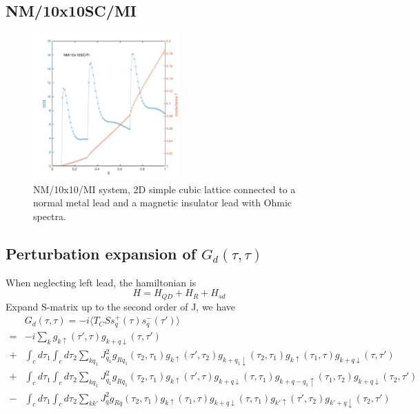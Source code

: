 \documentclass[aps,prb,superscriptaddress]{revtex4-2}
\begin{document}
\subsection{NM/10x10SC/MI}
\begin{figure}[htp!]
\centering
\includegraphics[width=0.5\textwidth, height=0.4\textwidth]{figures/DOST-NM-FI.pdf}
\caption{NM/10x10/MI system, 2D simple cubic lattice connected to a normal metal lead and a magnetic insulator lead with Ohmic spectra.}
\end{figure}

\subsection{Perturbation expansion of $G_{d}(\tau, \tau)$}

When neglecting left lead, the hamiltonian is
\begin{equation}
H = H_{QD} + H_{R} + H_{sd}
\end{equation}
Expand S-matrix up to the second order of J, we have
\begin{equation}
\begin{split}
&G_{d}(\tau, \tau) = -i\langle T_{C}Ss_{q}^{+}(\tau)s_{q}^{-}(\tau') \rangle \\
=& -i\sum_{k} g_{k\uparrow}(\tau', \tau) g_{k+q\downarrow}(\tau, \tau') \\
+& \int_{c}d\tau_{1}\int_{c}d\tau_{2} \sum_{kq_{1}} J_{q_{1}}^{2} g_{Rq_{1}}(\tau_{2}, \tau_{1}) g_{k\uparrow}(\tau', \tau_{2}) g_{k+q_{1}\downarrow}(\tau_{2}, \tau_{1}) g_{k\uparrow}(\tau_{1}, \tau) g_{k+q\downarrow}(\tau, \tau') \\
+& \int_{c}d\tau_{1}\int_{c}d\tau_{2} \sum_{kq_{1}} J_{q_{1}}^{2} g_{Rq_{1}}(\tau_{2}, \tau_{1}) g_{k\uparrow}(\tau', \tau) g_{k+q\downarrow}(\tau, \tau_{1}) g_{k+q-q_{1}\uparrow}(\tau_{1}, \tau_{2}) g_{k+q\downarrow}(\tau_{2}, \tau') \\
-& \int_{c}d\tau_{1}\int_{c}d\tau_{2} \sum_{kk'} J_{q}^{2} g_{Rq}(\tau_{2}, \tau_{1}) g_{k\uparrow}(\tau_{1}, \tau) g_{k+q\downarrow}(\tau, \tau_{1})  g_{k'\uparrow}(\tau', \tau_{2}) g_{k'+q\downarrow}(\tau_{2}, \tau')
\end{split}
\end{equation}
\end{document}
